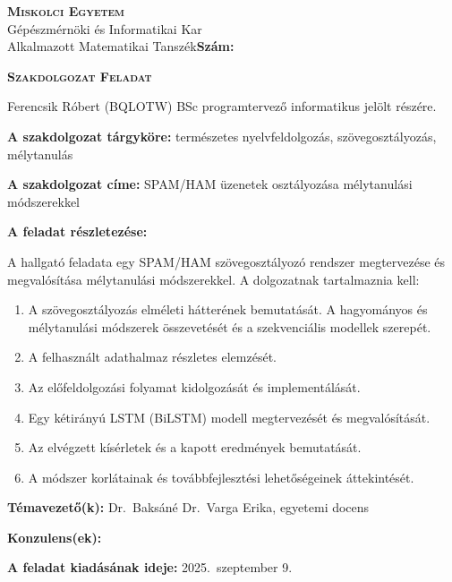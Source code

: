 \noindent
\textsc{\textbf{Miskolci Egyetem}}\\
Gépészmérnöki és Informatikai Kar\\
Alkalmazott Matematikai Tanszék\hspace*{4cm}\hfil \textbf{Szám:}

\vspace{0.5cm}
\begin{center}
\large\textsc{\textbf{Szakdolgozat Feladat}}
\end{center}
\vspace{0.5cm}

Ferencsik Róbert (BQLOTW) BSc programtervező informatikus jelölt részére.

\bigskip
\noindent\textbf{A szakdolgozat tárgyköre:} természetes nyelvfeldolgozás, szövegosztályozás, mélytanulás

\bigskip
\noindent\textbf{A szakdolgozat címe:} SPAM/HAM üzenetek osztályozása mélytanulási módszerekkel

\bigskip
\noindent\textbf{A feladat részletezése:}

\medskip

\noindent A hallgató feladata egy SPAM/HAM szövegosztályozó rendszer megtervezése és megvalósítása mélytanulási módszerekkel. A dolgozatnak tartalmaznia kell:

\medskip
\begin{enumerate}
    \item A szövegosztályozás elméleti hátterének bemutatását. A hagyományos és mélytanulási módszerek összevetését és a szekvenciális modellek szerepét.
    \item A felhasznált adathalmaz részletes elemzését.
    \item Az előfeldolgozási folyamat kidolgozását és implementálását.
    \item Egy kétirányú LSTM (BiLSTM) modell megtervezését és megvalósítását.
    \item Az elvégzett kísérletek és a kapott eredmények bemutatását.
    \item A módszer korlátainak és továbbfejlesztési lehetőségeinek áttekintését.
\end{enumerate}

\vfill

\noindent\textbf{Témavezető(k):} Dr.\ Baksáné Dr.\ Varga Erika, egyetemi docens

\noindent\textbf{Konzulens(ek):}

\bigskip
\noindent\textbf{A feladat kiadásának ideje:} 2025.\ szeptember 9.

